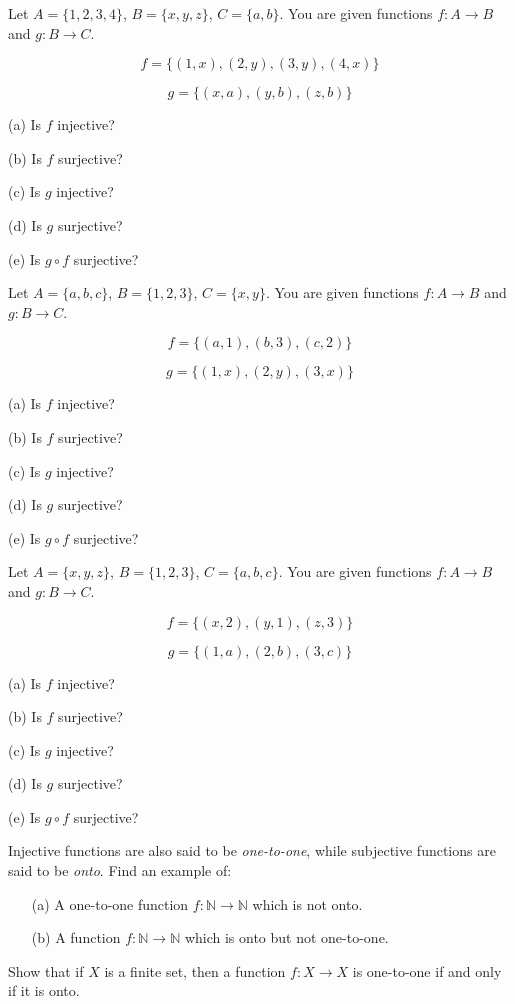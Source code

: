\documentclass[11pt,paper=b5,footinclude,headinclude]{scrbook} %
\theoremstyle{remark}
\theoremstyle{definition} %
\theoremstyle{theorem} %
\newtheorem{ex}{Exercise\hypertarget{sol:\theex}}[chapter]
\begin{document}
\begin{ex}
 Let $A = \{1,2,3,4\}$, $B = \{x,y,z\}$, $C = \{a,b\}$. You are given functions $f:A\to B$ and $g:B\to C$.

\[ f = \{(1,x),(2,y),(3,y),(4,x)\} \]

\[ g = \{(x,a),(y,b),(z,b)\} \]

(a) Is $f$ injective?

(b) Is $f$ surjective?

(c) Is $g$ injective?

(d) Is $g$ surjective?

(e) Is $g \circ f$ surjective?

\end{ex}
\begin{ex}
 Let $A = \{a,b,c\}$, $B = \{1,2,3\}$, $C = \{x,y\}$. You are given functions $f:A\to B$ and $g:B\to C$.

\[ f = \{(a,1),(b,3),(c,2)\} \]

\[ g = \{(1,x),(2,y),(3,x)\} \]

(a) Is $f$ injective?

(b) Is $f$ surjective?

(c) Is $g$ injective?

(d) Is $g$ surjective?

(e) Is $g \circ f$ surjective?
    
\end{ex}
\begin{ex}
 Let $A = \{x,y,z\}$, $B = \{1,2,3\}$, $C = \{a,b,c\}$. You are given functions $f:A\to B$ and $g:B\to C$.

\[ f = \{(x,2),(y,1),(z,3)\} \]

\[ g = \{(1,a),(2,b),(3,c)\} \]

(a) Is $f$ injective?

(b) Is $f$ surjective?

(c) Is $g$ injective?

(d) Is $g$ surjective?

(e) Is $g \circ f$ surjective?
\end{ex}


\begin{ex}
Injective functions are also said to be \emph{one-to-one}, while subjective functions are said to be \emph{onto}.
Find an example of:
\begin{enumerate}
    \item[(a)] A one-to-one function \( f : \mathbb{N} \to \mathbb{N} \) which is not onto. 
    \item[(b)] A function \( f : \mathbb{N} \to \mathbb{N} \) which is onto but not one-to-one.
\end{enumerate}
\end{ex}
\begin{ex}
Show that if \( X \) is a finite set, then a function \( f : X \to X \) is one-to-one if and only if it is onto.
\end{ex}
\end{document}
